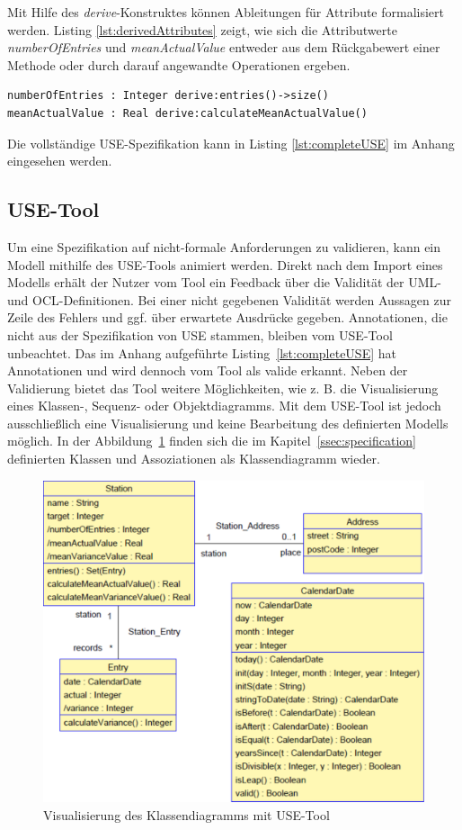 \documentclass[a4paper,twoside]{article}
\begin{document}
Mit Hilfe des \textit{derive}-Konstruktes können Ableitungen für Attribute formalisiert werden. Listing \ref{lst:derivedAttributes} zeigt, wie sich die Attributwerte \textit{numberOfEntries} und \textit{meanActualValue} entweder aus dem Rückgabewert einer Methode oder durch darauf angewandte Operationen ergeben.
\begin{lstlisting}[caption={Abgeleitete Attribute der Klasse Station},label=lst:derivedAttributes]
numberOfEntries : Integer derive:entries()->size()
meanActualValue : Real derive:calculateMeanActualValue()
\end{lstlisting}

Die vollständige USE-Spezifikation kann in Listing \ref{lst:completeUSE} im Anhang eingesehen werden.
\subsection{USE-Tool}
\label{sec:use_tool}

Um eine Spezifikation auf nicht-formale Anforderungen zu validieren, kann ein Modell mithilfe des USE-Tools animiert werden. Direkt nach dem Import eines Modells erhält der Nutzer vom Tool ein Feedback über die Validität der UML- und OCL-Definitionen. Bei einer nicht gegebenen Validität werden Aussagen zur Zeile des Fehlers und ggf. über erwartete Ausdrücke gegeben. Annotationen, die nicht aus der Spezifikation von USE stammen, bleiben vom USE-Tool unbeachtet. Das im Anhang aufgeführte Listing~\ref{lst:completeUSE} hat Annotationen und wird dennoch vom Tool als valide erkannt. Neben der Validierung bietet das Tool weitere Möglichkeiten, wie z. B. die Visualisierung eines Klassen-, Sequenz- oder Objektdiagramms. Mit dem USE-Tool ist jedoch ausschließlich eine Visualisierung und keine Bearbeitung des definierten Modells möglich. In der Abbildung~\ref{fig:Grafik2} finden sich die im Kapitel~\ref{ssec:specification} definierten Klassen und Assoziationen als Klassendiagramm wieder.

\begin{figure}[!h]
	\includegraphics[scale=.325]{pics/USE_class_diagram_v2.pdf}
	\caption{Visualisierung des Klassendiagramms mit USE-Tool}
	\label{fig:Grafik2}
\end{figure}
\end{document}
